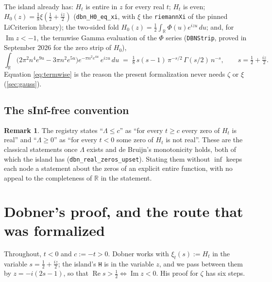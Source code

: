 \documentclass[11pt]{article}
\theoremstyle{definition}
\newtheorem{remark}[theorem]{Remark}
\newcommand{\lean}[1]{\texttt{#1}}
\newcommand{\Lam}{\Lambda}
\newcommand{\Hfun}{H}
\newcommand{\re}{\operatorname{Re}}
\newcommand{\im}{\operatorname{Im}}
\newcommand{\R}{\mathbb{R}}
\begin{document}
\noindent
The island already has: $\Hfun_t$ is entire in $z$ for every real $t$; $\Hfun_t$ is even; $\Hfun_0(z) = \tfrac18\xi(\tfrac12 + \tfrac{iz}{2})$ (\lean{dbn\_H0\_eq\_xi}, with $\xi$ the \lean{riemannXi} of the pinned LiCriterion library); the two-sided fold $\Hfun_0(z) = \tfrac12\int_\R \Phi(u)e^{izu}\,du$; and, for $\im z < -1$, the termwise Gamma evaluation of the $\Phi$ series (\lean{DBNStrip}, proved in September 2026 for the zero strip of $\Hfun_0$),
\begin{equation}\label{eq:termwise}
\int_\R \bigl(2\pi^2 n^4 e^{9u} - 3\pi n^2 e^{5u}\bigr)e^{-\pi n^2 e^{4u}}\,e^{izu}\,du
\;=\; \tfrac18\, s(s-1)\,\pi^{-s/2}\,\Gamma(s/2)\, n^{-s},\qquad s = \tfrac12 + \tfrac{iz}{2}.
\end{equation}
Equation \eqref{eq:termwise} is the reason the present formalization never needs $\zeta$ or $\xi$ (\cref{sec:gauss}).

\subsection{The sInf-free convention}

\begin{remark}\label{rem:sinf}
The registry states ``$\Lam \le c$'' as ``for every $t \ge c$ every zero of $\Hfun_t$ is real'' and ``$\Lam \ge 0$'' as ``for every $t < 0$ some zero of $\Hfun_t$ is not real''. These are the classical statements once $\Lam$ exists and de Bruijn's monotonicity holds, both of which the island has (\lean{dbn\_real\_zeros\_upset}). Stating them without $\inf$ keeps each node a statement about the zeros of an explicit entire function, with no appeal to the completeness of $\R$ in the statement.
\end{remark}

\section{Dobner's proof, and the route that was formalized}\label{sec:route}

Throughout, $t < 0$ and $c := -t > 0$. Dobner works with $\xi_t(s) := \Hfun_t$ in the variable $s = \tfrac12 + \tfrac{iz}{2}$; the island's \lean{H} is in the variable $z$, and we pass between them by $z = -i(2s-1)$, so that $\re s > \tfrac12 \Leftrightarrow \im z < 0$. His proof for $\zeta$ has six steps.
\end{document}
